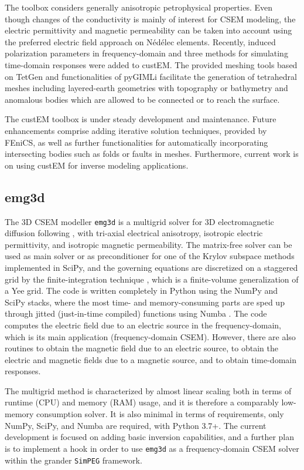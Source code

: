 \documentclass[
    paper,
  ]{geophysics}
\newcommand{\emg}[2]{\texttt{emg#1#2}\xspace}
\newcommand{\simpeg}{\texttt{SimPEG}\xspace}
\begin{document}
The toolbox considers generally anisotropic petrophysical properties. Even
though changes of the conductivity is mainly of interest for CSEM modeling, the
electric permittivity and magnetic permeability can be taken into account using
the preferred electric field approach on Nédélec elements. Recently, induced
polarization parameters in frequency-domain and three methods for simulating
time-domain responses were added to custEM. The provided meshing tools based on
TetGen \citep{TOM.15.Si} and functionalities of pyGIMLi \citep{CAG.17.Rucker}
facilitate the generation of tetrahedral meshes including layered-earth
geometries with topography or bathymetry and anomalous bodies which are allowed
to be connected or to reach the surface.

The custEM toolbox is under steady development and maintenance. Future
enhancements comprise adding iterative solution techniques, provided by FEniCS,
as well as further functionalities for automatically incorporating intersecting
bodies such as folds or faults in meshes. Furthermore, current work is on using
custEM for inverse modeling applications.


\subsection{emg3d}

The 3D CSEM modeller \emg3d is a multigrid \citep{CMMP.64.Fedorenko} solver for
3D electromagnetic diffusion following \cite{GP.06.Mulder}, with tri-axial
electrical anisotropy, isotropic electric permittivity, and isotropic magnetic
permeability. The matrix-free solver can be used as main solver or as
preconditioner for one of the Krylov subspace methods implemented in SciPy, and
the governing equations are discretized on a staggered grid by the
finite-integration technique \citep{AEU.77.Weiland}, which is a finite-volume
generalization of a Yee grid. The code is written completely in Python using
the NumPy and SciPy stacks, where the most time- and memory-consuming parts are
sped up through jitted (just-in-time compiled) functions using Numba
\citep{LLVM.15.Lam}. The code computes the electric field due to an electric
source in the frequency-domain, which is its main application (frequency-domain
CSEM). However, there are also routines to obtain the magnetic field due to an
electric source, to obtain the electric and magnetic fields due to a magnetic
source, and to obtain time-domain responses.

The multigrid method is characterized by almost linear scaling both in terms of
runtime (CPU) and memory (RAM) usage, and it is therefore a comparably
low-memory consumption solver. It is also minimal in terms of requirements,
only NumPy, SciPy, and Numba are required, with Python 3.7+. The current
development is focused on adding basic inversion capabilities, and a further
plan is to implement a hook in order to use \emg3d as a frequency-domain CSEM
solver within the grander \simpeg framework.
\end{document}
